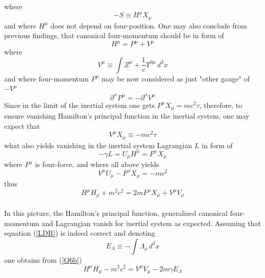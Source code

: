 \documentclass[aps,prx,preprint,groupedaddress,showkeys]{revtex4-2}
\begin{document}
where 
\begin{equation} \label{Q2a}
- S \equiv H^{\mu}X_{\mu}
\end{equation}
and where $H^{\mu}$ does not depend on four-position. One may also conclude from previous findings, that canonical four-momentum should be in form of
\begin{equation} \label{Q5}
H^{\mu} = P^{\mu} + V^{\mu} 
\end{equation}
where 
\begin{equation} \label{CD1}
V^{\mu} \equiv \int Z^{\mu} + \frac{1}{c} \Upsilon^{0 \mu} \, d^3 x
\end{equation}
and where four-momentum $P^{\mu}$ may be now considered as just "other gauge" of  $-V^{\mu}$ 
\begin{equation} \label{Q5b}
\partial^{\alpha} P^{\mu} = - \partial^{\alpha} V^{\mu}
\end{equation}
Since in the limit of the inertial system one gets $P^{\mu} X_{\mu} = mc^2\tau$, therefore, to ensure vanishing Hamilton's principal function in the inertial system, one may expect that
\begin{equation} \label{Q1}
V^{\mu} X_{\mu} \equiv - mc^2 \tau 
\end{equation}
what also yields vanishing in the inertial system Lagrangian $L$ in form of
\begin{equation} \label{Q4}
- \gamma L = U_{\mu} H^{\mu}= F^{\mu} X_{\mu} 
\end{equation}
where $F^{\mu}$ is four-force, and where all above yields
\begin{equation} \label{Q6}
V^{\mu} U_{\mu} - F^{\mu}X_{\mu} = - mc^2
\end{equation}
thus
\begin{equation} \label{Q6b}
H^{\mu} H_{\mu} + m^2c^2 = 2m F^{\mu}X_{\mu} + V^{\mu} V_{\mu}
\end{equation}
~\\
In this picture, the Hamilton's principal function, generalized canonical four-momentum and Lagrangian vanish for inertial system as expected. Assuming that equation (\ref{LDR}) is indeed correct and denoting
\begin{equation} \label{Elambda}
E_{\Lambda} \equiv - \int \Lambda_{\rho} \, d^3 x
\end{equation}
one obtains from (\ref{Q6b})
\begin{equation} \label{Q6c}
H^{\mu} H_{\mu} - m^2c^2 = V^{\mu} V_{\mu} - 2m\gamma E_{\Lambda}
\end{equation}
~\\
\end{document}
